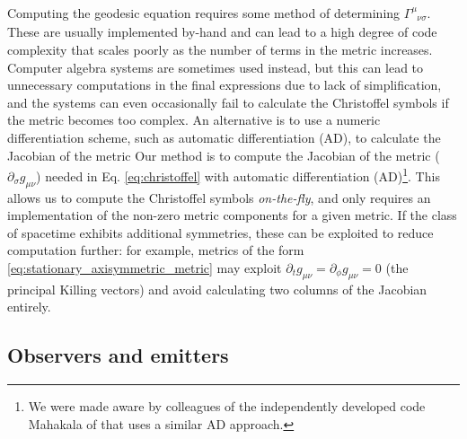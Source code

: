 \documentclass[fleqn,usenatbib]{mnras}
\newcommand{\utensor}[3]{#1^{#2}_{\phantom{#2}#3}}
\begin{document}
Computing the geodesic equation requires some method of determining
$\utensor{\Gamma}{\mu}{\nu\sigma}$.  These are usually implemented by-hand and
can lead to a high degree of code complexity that scales poorly as the number of
terms in the metric increases. Computer algebra systems are sometimes used
instead, but this can lead to unnecessary computations in the final expressions
due to lack of simplification, and the systems can even occasionally fail to
calculate the Christoffel symbols if the metric becomes too complex.  An
alternative is to use a numeric differentiation scheme, such as automatic
differentiation (AD), to calculate the Jacobian of the metric Our method is to
compute the Jacobian of the metric ($\partial_{\sigma} g_{\mu \nu}$) needed in
Eq.  \eqref{eq:christoffel} with automatic differentiation (AD)\footnote{We were
    made aware by colleagues of the independently developed code Mahakala of
    \citet{sharma_mahakala_2023} that uses a similar AD approach.}.  This allows
    us to compute the Christoffel symbols \emph{on-the-fly}, and only requires
an implementation of the non-zero metric components for a given metric. If
the class of spacetime exhibits additional symmetries, these can be
exploited to reduce computation further: for example, metrics of the form
\eqref{eq:stationary_axisymmetric_metric} may exploit $\partial_t g_{\mu\nu} =
\partial_{\phi} g_{\mu\nu} = 0$ (the principal Killing vectors) and avoid
calculating two columns of the Jacobian entirely.

\subsection{Observers and emitters}
\label{sec:observers-and-emitters}
\end{document}

